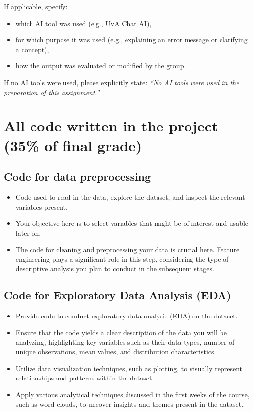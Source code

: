 If applicable, specify:
\begin{itemize}
\item which AI tool was used (e.g., UvA Chat AI),
\item for which purpose it was used (e.g., explaining an error message or clarifying a concept),
\item how the output was evaluated or modified by the group.
\end{itemize}

If no AI tools were used, please explicitly state: \emph{“No AI tools were used in the preparation of this assignment.”}
	
\section{All code written in the project (35\% of final grade)}

\subsection{Code for data preprocessing}
\begin{itemize}
	\item Code used to read in the data, explore the dataset, and inspect the relevant variables present.
	\item Your objective here is to select variables that might be of interest and usable later on.
	\item The code for cleaning and preprocessing your data is crucial here. Feature engineering plays a significant role in this step, considering the type of descriptive analysis you plan to conduct in the subsequent stages.
\end{itemize}

\subsection{Code for Exploratory Data Analysis (EDA)}
\begin{itemize}
\item Provide code to conduct exploratory data analysis (EDA) on the dataset.
\item Ensure that the code yields a clear description of the data you will be analyzing, highlighting key variables such as their data types, number of unique observations, mean values, and distribution characteristics.
\item Utilize data visualization techniques, such as plotting, to visually represent relationships and patterns within the dataset.
\item Apply various analytical techniques discussed in the first weeks of the course, such as word clouds, to uncover insights and themes present in the dataset.
\end{itemize}

